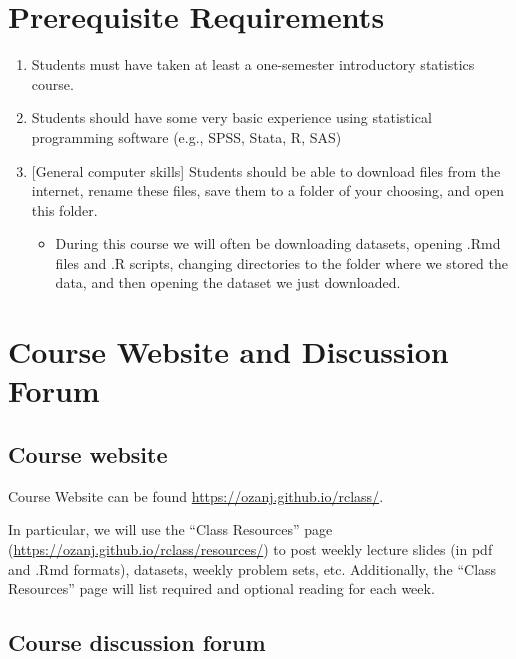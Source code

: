 \documentclass[11pt,]{article}
\providecommand{\tightlist}{%
  \setlength{\itemsep}{0pt}\setlength{\parskip}{0pt}}
\begin{document}
\hypertarget{prerequisite-requirements}{%
\section{Prerequisite Requirements}\label{prerequisite-requirements}}

\begin{enumerate}
\def\labelenumi{\arabic{enumi}.}
\tightlist
\item
  Students must have taken at least a one-semester introductory
  statistics course.\\
\item
  Students should have some very basic experience using statistical
  programming software (e.g., SPSS, Stata, R, SAS)
\item
  {[}General computer skills{]} Students should be able to download
  files from the internet, rename these files, save them to a folder of
  your choosing, and open this folder.

  \begin{itemize}
  \tightlist
  \item
    During this course we will often be downloading datasets, opening
    .Rmd files and .R scripts, changing directories to the folder where
    we stored the data, and then opening the dataset we just downloaded.
  \end{itemize}
\end{enumerate}

\hypertarget{course-website-and-discussion-forum}{%
\section{Course Website and Discussion
Forum}\label{course-website-and-discussion-forum}}

\hypertarget{course-website}{%
\subsection{Course website}\label{course-website}}

Course Website can be found \url{https://ozanj.github.io/rclass/}.

In particular, we will use the ``Class Resources'' page
(\url{https://ozanj.github.io/rclass/resources/}) to post weekly lecture
slides (in pdf and .Rmd formats), datasets, weekly problem sets, etc.
Additionally, the ``Class Resources'' page will list required and
optional reading for each week.

\hypertarget{course-discussion-forum}{%
\subsection{Course discussion forum}\label{course-discussion-forum}}
\end{document}
